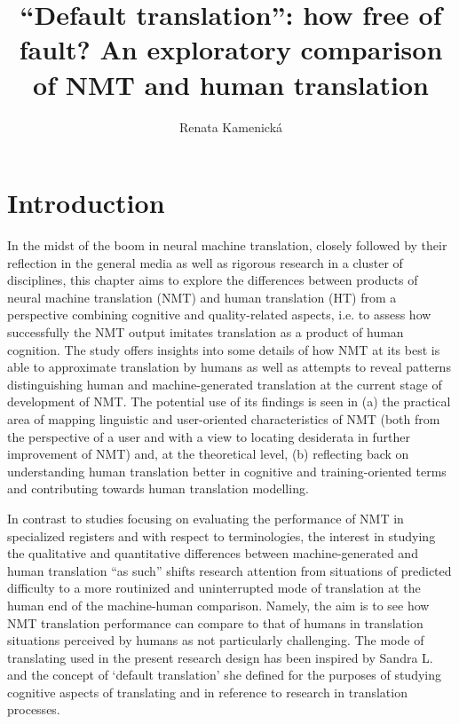 \documentclass[output=paper]{langscibook}
\author{Renata Kamenická\orcid{0009-0004-9256-2293}\affiliation{Masaryk University}}
\title[``Default translation'': how free of fault?]{``Default translation'': how free of fault? An exploratory comparison of NMT and human translation}
\begin{document}
\maketitle

\section{Introduction}

In the midst of the boom in neural machine translation, closely followed by their reflection in the general media as well as rigorous research in a cluster of disciplines, this chapter aims to explore the differences between products of neural machine translation (NMT) and human translation (HT) from a perspective combining cognitive and quality-related aspects, i.e. to assess how successfully the NMT output imitates translation as a product of human cognition. The study offers insights into some details of how NMT at its best is able to approximate translation by humans as well as attempts to reveal patterns distinguishing human and machine-generated translation at the current stage of development of NMT. The potential use of its findings is seen in (a) the practical area of mapping linguistic and user-oriented characteristics of NMT (both from the perspective of a user and with a view to locating desiderata in further improvement of NMT) and, at the theoretical level, (b) reflecting back on understanding human translation better in cognitive and training-oriented terms and contributing towards human translation modelling.

In contrast to studies focusing on evaluating the performance of NMT in specialized registers and with respect to terminologies, the interest in studying the qualitative and quantitative differences between machine-generated and human translation “as such” shifts research attention from situations of predicted difficulty to a more routinized and uninterrupted mode of translation at the human end of the machine-human comparison. Namely, the aim is to see how NMT translation performance can compare to that of humans in translation situations perceived by humans as not particularly challenging. The mode of translating used in the present research design has been inspired by Sandra L. \citet{Halverson2015,Halverson2019} and the concept of ‘default translation’ she defined for the purposes of studying cognitive aspects of translating and in reference to research in translation processes.
\end{document}
